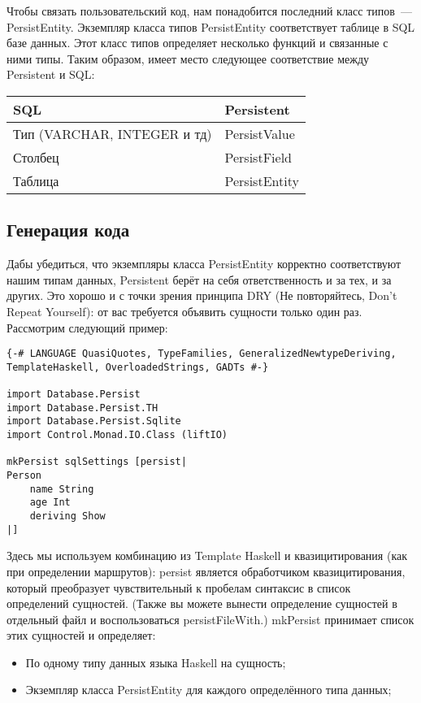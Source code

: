 Чтобы связать пользовательский код, нам понадобится последний класс типов~--- PersistEntity. Экземпляр класса типов PersistEntity соответствует таблице в SQL базе данных. Этот класс типов определяет несколько функций и связанные с ними типы. Таким образом, имеет место следующее соответствие между Persistent и SQL:

\begin{center}
\begin{tabular}{ | l | l |}
\hline
SQL	& Persistent \\ \hline
Тип (VARCHAR, INTEGER и тд)	& PersistValue \\ \hline
Столбец & PersistField \\ \hline
Таблица	& PersistEntity \\ \hline
\end{tabular}
\end{center}

\subsection{Генерация кода} %

Дабы убедиться, что экземпляры класса PersistEntity корректно соответствуют нашим типам данных, Persistent берёт на себя ответственность и за тех, и за других. Это хорошо и с точки зрения принципа DRY (Не повторяйтесь, Don't Repeat Yourself): от вас требуется объявить сущности только один раз. Рассмотрим следующий пример:

\begin{lstlisting}
{-# LANGUAGE QuasiQuotes, TypeFamilies, GeneralizedNewtypeDeriving, TemplateHaskell, OverloadedStrings, GADTs #-}

import Database.Persist
import Database.Persist.TH
import Database.Persist.Sqlite
import Control.Monad.IO.Class (liftIO)

mkPersist sqlSettings [persist|
Person
    name String
    age Int
    deriving Show
|]
\end{lstlisting}

Здесь мы используем комбинацию из Template Haskell и квазицитирования (как при
определении маршрутов): persist является обработчиком квазицитирования, который
преобразует чувствительный к пробелам синтаксис в список определений сущностей.
(Также вы можете вынести определение сущностей в отдельный файл и
воспользоваться persistFileWith.) mkPersist принимает список этих сущностей и определяет:

\begin{itemize}
  \item По одному типу данных языка Haskell на сущность;
  \item Экземпляр класса PersistEntity для каждого определённого типа данных;
\end{itemize}

